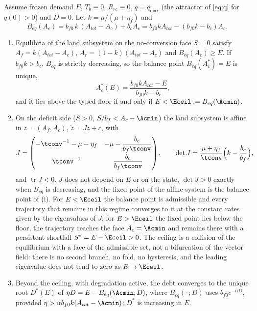 \begin{proposition}\label{prop:ceiling}
Assume frozen demand $E$, $T_b\equiv0$, $R_{rc}\equiv0$, $q=q_{\max}$ (the attractor of \eqref{eq:q} for $q(0)>0$) and $D=0$. Let $k=\mu/(\mu+\eta_f)$ and
\begin{equation}\label{eq:Beq}
B_{eq}(A_c)=b_{f0}\,k\,(A_{tot}-A_c)+b_cA_c=b_{f0}kA_{tot}-(b_{f0}k-b_c)A_c .
\end{equation}
\begin{enumerate}[label=(\roman*)]
\item Equilibria of the land subsystem on the no-conversion face $S=0$ satisfy $A_f=k(A_{tot}-A_c)$, $A_r=(1-k)(A_{tot}-A_c)$ and $B_{eq}(A_c)\ge E$. If $b_{f0}k>b_c$, $B_{eq}$ is strictly decreasing, so the balance point $B_{eq}(A_c^*)=E$ is unique,
\begin{equation}\label{eq:Acstar}
A_c^*(E)=\frac{b_{f0}kA_{tot}-E}{b_{f0}k-b_c},
\end{equation}
and it lies above the typed floor if and only if $E<\Eceil:=B_{eq}(\Acmin)$.
\item On the deficit side ($S>0$, $S/b_f<A_c-\Acmin$) the land subsystem is affine in $z=(A_f,A_c)$, $\dot z=Jz+c$, with
\begin{equation}\label{eq:J}
J=\begin{pmatrix}-\tconv^{-1}-\mu-\eta_f & -\mu-\dfrac{b_c}{b_f\tconv}\\[8pt] \tconv^{-1} & \dfrac{b_c}{b_f\tconv}\end{pmatrix},
\qquad \det J=\frac{\mu+\eta_f}{\tconv}\Big(k-\frac{b_c}{b_f}\Big),
\end{equation}
and $\operatorname{tr}J<0$.
$J$ does not depend on $E$ or on the state, $\det J>0$ exactly when $B_{eq}$ is decreasing, and the fixed point of the affine system is the balance point of (i). For $E<\Eceil$ the balance point is admissible and every trajectory that remains in this regime converges to it at the constant rates given by the eigenvalues of $J$; for $E>\Eceil$ the fixed point lies below the floor, the trajectory reaches the face $A_c=\Acmin$ and remains there with a persistent shortfall $S^*=E-\Eceil>0$. The ceiling is a collision of the equilibrium with a face of the admissible set, not a bifurcation of the vector field: there is no second branch, no fold, no hysteresis, and the leading eigenvalue does not tend to zero as $E\to\Eceil$.
\item Beyond the ceiling, with degradation active, the debt converges to the unique root $D^*(E)$ of $\eta D=E-B_{eq}(\Acmin;D)$, where $B_{eq}(\cdot\,;D)$ uses $b_{f0}e^{-\alpha D}$, provided $\eta>\alpha b_{f0}k(A_{tot}-\Acmin)$; $D^*$ is increasing in $E$.
\end{enumerate}
\end{proposition}

